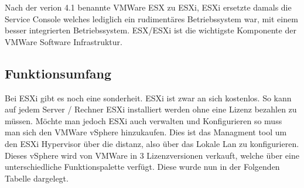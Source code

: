 \documentclass[14pt]{extreport}
\begin{document}
Nach der verion 4.1 benannte VMWare ESX zu ESXi, ESXi ersetzte damals die Service Console welches lediglich ein rudimentäres Betriebssystem war, mit einem besser integrierten Betriebssystem. ESX/ESXi ist die wichtigste Komponente der VMWare Software Infrastruktur. \\


\subsection{Funktionsumfang}
Bei ESXi gibt es noch eine sonderheit. ESXi ist zwar an sich kostenlos. So kann auf jedem Server / Rechner ESXi installiert werden ohne eine Lizenz bezahlen zu müssen. Möchte man jedoch ESXi auch verwalten und Konfigurieren so muss man sich den VMWare vSphere hinzukaufen. Dies ist das Managment tool um den ESXi Hypervisor über die distanz, also über das Lokale Lan zu konfigurieren. Dieses vSphere wird von VMWare in 3 Lizenzversionen verkauft, welche über eine unterschiedliche Funktionspalette verfügt. Diese wurde nun in der Folgenden Tabelle dargelegt.
\end{document}
